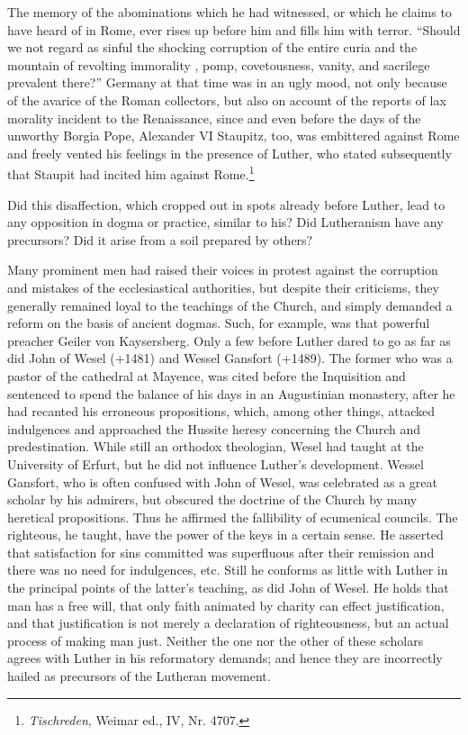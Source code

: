 The memory of the abominations which he had witnessed, or
which he claims to have heard of in Rome, ever rises up before
him and fills him with terror. “Should we not regard as sinful the
shocking corruption of the entire curia and the mountain of revolting immorality
, pomp, covetousness, vanity, and sacrilege prevalent
there?” Germany at that time was in an ugly mood, not only
because of the avarice of the Roman collectors, but also on account
of the reports of lax morality incident to the Renaissance, since and
even before the days of the unworthy Borgia Pope, Alexander VI
Staupitz, too, was embittered against Rome and freely vented his feelings
in the presence of Luther, who stated subsequently that Staupit
had incited him against Rome.\footnote{\textit{Tischreden}, Weimar ed., IV, Nr. 4707.}

Did this disaffection, which cropped out in spots already before
Luther, lead to any opposition in dogma or practice, similar to his?
Did Lutheranism have any precursors? Did it arise from a soil
prepared by others?

Many prominent men had raised their voices in protest against
the corruption and mistakes of the ecclesiastical authorities, but
despite their criticisms, they generally remained loyal to the teachings
of the Church, and simply demanded a reform on the basis
of ancient dogmas. Such, for example, was that powerful preacher
Geiler von Kaysersberg. Only a few before Luther dared to go as
far as did John of Wesel (+1481) and Wessel Gansfort (+1489).
The former who was a pastor of the cathedral at Mayence,
was cited before the Inquisition and sentenced to spend the balance
of his days in an Augustinian monastery, after he had recanted
his erroneous propositions, which, among other things, attacked indulgences
and approached the Hussite heresy concerning the Church
and predestination. While still an orthodox theologian, Wesel had
taught at the University of Erfurt, but he did not influence Luther’s
development. Wessel Gansfort, who is often confused with John
of Wesel, was celebrated as a great scholar by his admirers, but
obscured the doctrine of the Church by many heretical propositions.
Thus he affirmed the fallibility of ecumenical councils. The
righteous, he taught, have the power of the keys in a certain sense.
He asserted that satisfaction for sins committed was superfluous
after their remission and there was no need for indulgences, etc.
Still he conforms as little with Luther in the principal points of
the latter’s teaching, as did John of Wesel. He holds that man
has a free will, that only faith animated by charity can effect justification,
and that justification is not merely a declaration of righteousness,
but an actual process of making man just. Neither the one
nor the other of these scholars agrees with Luther in his reformatory
demands; and hence they are incorrectly hailed as precursors of the
Lutheran movement.

